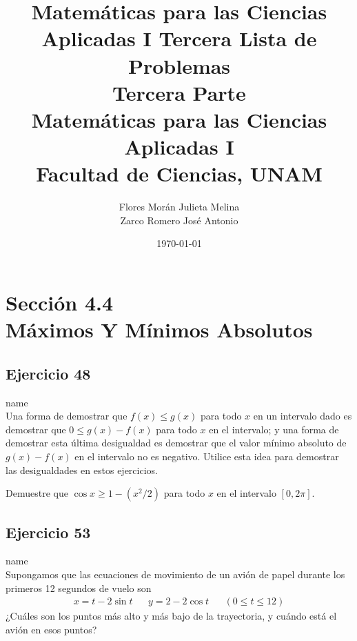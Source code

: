 \documentclass[12pt]{article}
\title{Matemáticas para las Ciencias Aplicadas I}
\title{
	Tercera Lista de Problemas \\
	\textbf{Tercera  Parte} \\
	\vspace{1ex}
	\large Matemáticas para las Ciencias Aplicadas I \\
	Facultad de Ciencias, UNAM}
\date{\today}
\author{Flores Morán Julieta Melina \\ Zarco Romero José Antonio}
\begin{document}
\maketitle


\section{Sección 4.4 \\ Máximos Y Mínimos Absolutos}
\subsection{Ejercicio 48} name \\

Una forma de demostrar que $f(x) \leq g(x)$ para todo $x$ en un intervalo dado es demostrar que $0 \leq g(x)-f(x)$ para todo $x$ en el intervalo; y una forma de demostrar esta última desigualdad es demostrar que el valor mínimo absoluto de $g(x)-f(x)$ en el intervalo no es negativo. Utilice esta idea para demostrar las desigualdades en estos ejercicios.

Demuestre que $\cos{x} \geq 1-(x^2 /2)$ para todo $x$ en el intervalo $[0, 2\pi]$.

\subsection{Ejercicio 53} name \\

Supongamos que las ecuaciones de movimiento de un avión de papel durante los primeros 12 segundos de vuelo son
\begin{align*}
  x=t-2\sin{t} && y=2-2\cos{t} && (0\leq t\leq 12)
\end{align*}
¿Cuáles son los puntos más alto y más bajo de la trayectoria, y cuándo está el avión en esos puntos?
\end{document}
